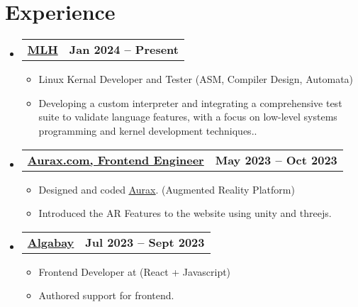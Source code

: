 \documentclass[a4paper,11pt]{article}
\makeatletter
\newcommand{\resumeItem}[1]{
  \item\small{
    {#1 \vspace{-2pt}}
  }
}
\newcommand{\resumeSubheadingg}[2]{
  \vspace{-2pt}\item
    \begin{tabular*}{1.0\textwidth}[t]{l@{\extracolsep{\fill}}r}
      \textbf{#1} & \textbf{\small #2} \\
    \end{tabular*}\vspace{-7pt}
}
\newcommand{\resumeSubHeadingListStart}{\begin{itemize}[leftmargin=0.0in, label={}]}
\newcommand{\resumeSubHeadingListEnd}{\end{itemize}}
\newcommand{\resumeItemListStart}{\begin{itemize}}
\newcommand{\resumeItemListEnd}{\end{itemize}\vspace{-5pt}}
\makeatother
\begin{document}
\section{Experience}
  \resumeSubHeadingListStart

 \resumeSubheadingg
      {\href{https://mlh.io/}{MLH}}{Jan 2024 -- Present}
      \resumeItemListStart
        \resumeItem{Linux Kernal Developer and Tester (ASM, Compiler Design, Automata)}
        \resumeItem{Developing a custom interpreter and integrating a comprehensive test suite to validate language features, with a focus on low-level systems programming and kernel development techniques..}
    \resumeItemListEnd
 \resumeSubheadingg
      {\href{https://aurax.co.in/}{Aurax.com, Frontend Engineer}}{May 2023 -- Oct 2023}
      \resumeItemListStart
        \resumeItem{Designed and coded \underline{\href{https://aurax.co.in/}{Aurax}}. (Augmented Reality Platform)}
        \resumeItem{Introduced the AR Features to the website using unity and threejs.}
    \resumeItemListEnd

    \resumeSubheadingg
      {\href{https://algabay.com}{Algabay}}{Jul 2023 -- Sept 2023}
      \resumeItemListStart
        \resumeItem{Frontend Developer at \underline{\href{https://algabay.com}{}}(React + Javascript)}
        \resumeItem{Authored support for frontend.}
    \resumeItemListEnd

  
    
  \resumeSubHeadingListEnd
\vspace{-16pt}
\end{document}
